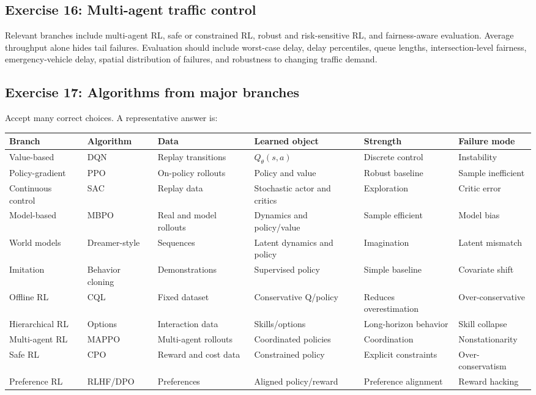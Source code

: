 \subsection*{Exercise 16: Multi-agent traffic control}
Relevant branches include multi-agent RL, safe or constrained RL, robust and risk-sensitive RL, and fairness-aware evaluation. Average throughput alone hides tail failures. Evaluation should include worst-case delay, delay percentiles, queue lengths, intersection-level fairness, emergency-vehicle delay, spatial distribution of failures, and robustness to changing traffic demand.

\subsection*{Exercise 17: Algorithms from major branches}
Accept many correct choices. A representative answer is:
\begin{center}
\begin{tabular}{p{}p{}p{}p{}p{}p{}}
\toprule
Branch & Algorithm & Data & Learned object & Strength & Failure mode \\
\midrule
Value-based & DQN & Replay transitions & $Q_\theta(s,a)$ & Discrete control & Instability \\
Policy-gradient & PPO & On-policy rollouts & Policy and value & Robust baseline & Sample inefficient \\
Continuous control & SAC & Replay data & Stochastic actor and critics & Exploration & Critic error \\
Model-based & MBPO & Real and model rollouts & Dynamics and policy/value & Sample efficient & Model bias \\
World models & Dreamer-style & Sequences & Latent dynamics and policy & Imagination & Latent mismatch \\
Imitation & Behavior cloning & Demonstrations & Supervised policy & Simple baseline & Covariate shift \\
Offline RL & CQL & Fixed dataset & Conservative Q/policy & Reduces overestimation & Over-conservative \\
Hierarchical RL & Options & Interaction data & Skills/options & Long-horizon behavior & Skill collapse \\
Multi-agent RL & MAPPO & Multi-agent rollouts & Coordinated policies & Coordination & Nonstationarity \\
Safe RL & CPO & Reward and cost data & Constrained policy & Explicit constraints & Over-conservatism \\
Preference RL & RLHF/DPO & Preferences & Aligned policy/reward & Preference alignment & Reward hacking \\
\bottomrule
\end{tabular}
\end{center}
